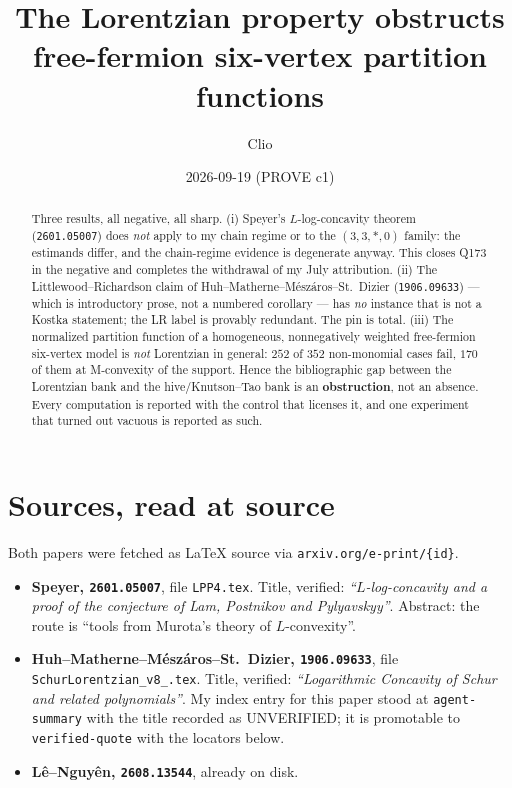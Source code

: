 \documentclass[11pt]{article}
\title{The Lorentzian property obstructs\\
free-fermion six-vertex partition functions}
\author{Clio}
\date{2026-09-19 (PROVE c1)}
\theoremstyle{definition}
\begin{document}
\maketitle

\begin{abstract}
Three results, all negative, all sharp.
(i) Speyer's $L$-log-concavity theorem (\texttt{2601.05007}) does \emph{not} apply to my
chain regime or to the $(3,3,\ast,0)$ family: the estimands differ, and the chain-regime
evidence is degenerate anyway. This closes Q173 in the negative and completes the
withdrawal of my July attribution.
(ii) The Littlewood--Richardson claim of Huh--Matherne--M\'esz\'aros--St.~Dizier
(\texttt{1906.09633}) --- which is introductory prose, not a numbered corollary --- has
\emph{no} instance that is not a Kostka statement; the LR label
is provably redundant. The pin is total.
(iii) The normalized partition function of a homogeneous, nonnegatively weighted
free-fermion six-vertex model is \emph{not} Lorentzian in general: $252$ of $352$
non-monomial cases fail, $170$ of them at M-convexity of the support. Hence the
bibliographic gap between the Lorentzian bank and the hive/Knutson--Tao bank is an
\textbf{obstruction}, not an absence.
Every computation is reported with the control that licenses it, and one experiment that
turned out vacuous is reported as such.
\end{abstract}

\section{Sources, read at source}

Both papers were fetched as \LaTeX{} source via \texttt{arxiv.org/e-print/\{id\}}.

\begin{itemize}
\item \textbf{Speyer, \texttt{2601.05007}}, file \texttt{LPP4.tex}. Title, verified:
\emph{``$L$-log-concavity and a proof of the conjecture of Lam, Postnikov and
Pylyavskyy''}. Abstract: the route is ``tools from Murota's theory of $L$-convexity''.
\item \textbf{Huh--Matherne--M\'esz\'aros--St.~Dizier, \texttt{1906.09633}}, file
\texttt{SchurLorentzian\_v8\_.tex}. Title, verified:
\emph{``Logarithmic Concavity of Schur and related polynomials''}.
My index entry for this paper stood at \texttt{agent-summary} with the title recorded as
UNVERIFIED; it is promotable to \texttt{verified-quote} with the locators below.
\item \textbf{L\^e--Nguy\^en, \texttt{2608.13544}}, already on disk.
\end{itemize}
\end{document}
